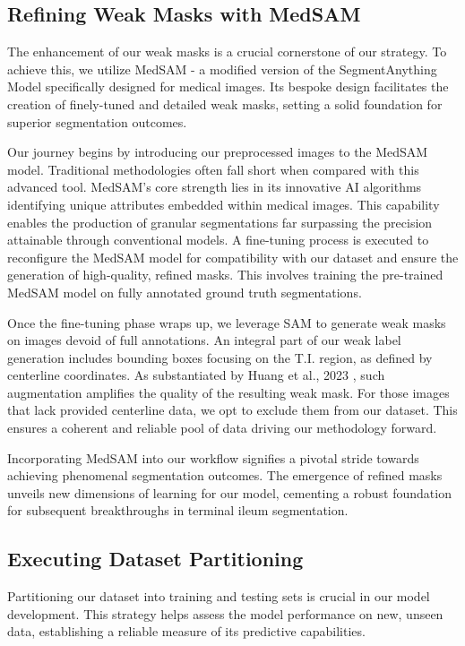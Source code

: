 \subsection{Refining Weak Masks with MedSAM}

The enhancement of our weak masks is a crucial cornerstone of our strategy. To achieve this, we utilize MedSAM - a modified version of the SegmentAnything Model specifically designed for medical images. Its bespoke design facilitates the creation of finely-tuned and detailed weak masks, setting a solid foundation for superior segmentation outcomes.

Our journey begins by introducing our preprocessed images to the MedSAM model. Traditional methodologies often fall short when compared with this advanced tool. MedSAM's core strength lies in its innovative AI algorithms identifying unique attributes embedded within medical images. This capability enables the production of granular segmentations far surpassing the precision attainable through conventional models. A fine-tuning process is executed to reconfigure the MedSAM model for compatibility with our dataset and ensure the generation of high-quality, refined masks. This involves training the pre-trained MedSAM model on fully annotated ground truth segmentations.

Once the fine-tuning phase wraps up, we leverage SAM to generate weak masks on images devoid of full annotations. An integral part of our weak label generation includes bounding boxes focusing on the T.I. region, as defined by centerline coordinates. As substantiated by Huang et al., 2023 \cite{huang2023segment}, such augmentation amplifies the quality of the resulting weak mask. For those images that lack provided centerline data, we opt to exclude them from our dataset. This ensures a coherent and reliable pool of data driving our methodology forward.

Incorporating MedSAM into our workflow signifies a pivotal stride towards achieving phenomenal segmentation outcomes. The emergence of refined masks unveils new dimensions of learning for our model, cementing a robust foundation for subsequent breakthroughs in terminal ileum segmentation.

\subsection{Executing Dataset Partitioning}

Partitioning our dataset into training and testing sets is crucial in our model development. This strategy helps assess the model performance on new, unseen data, establishing a reliable measure of its predictive capabilities.

